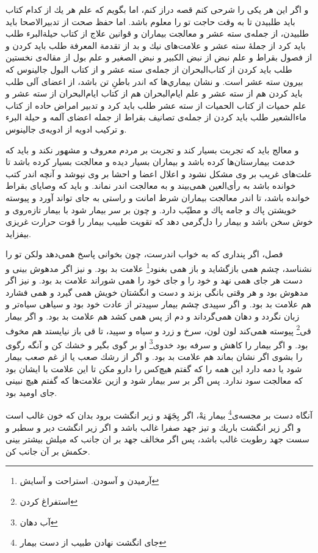 و اگر اين هر يكى را شرحى كنم قصه دراز كنم، اما بگويم كه علم هر يك از كدام كتاب بايد طلبيدن تا به وقت حاجت تو را معلوم باشد. اما حفظ صحت از تدبير‌الاصحا بايد طلبيدن، از جمله‌ی سته عشر و معالجت بيماران و قوانين علاج از كتاب حيلة‌البرء طلب بايد كرد از جملۀ سته عشر و علامت‌هاى نيك و بد از تقدمة المعرفة طلب بايد كردن و از فصول بقراط و علم نبض از نبض الكبير و نبض الصغير و علم بول از مقاله‌ی نخستين طلب بايد كردن از كتاب‌البحران از جمله‌ی سته عشر و از كتاب البول جالينوس كه بيرون سته عشر است. و نشان بيماري‌ها كه اندر باطنِ تن باشد، از اعضاى آلى طلب بايد كردن هم از سته عشر و علم ايام‌البحران هم از كتاب ايام‌البحران از سته عشر و علم حميات از كتاب الحميات از سته عشر طلب بايد كرد و تدبير امراض حاده از كتاب ماء‌الشعير طلب بايد كردن از جمله‌ی تصانيف بقراط از جمله اعضاى آلمه و حيلة البرء و تركيب ادويه از ادويه‌ی جالينوس.

و معالج بايد كه تجربت بسيار كند و تجربت بر مردم معروف و مشهور نكند و بايد كه خدمت بيمارستان‌ها كرده باشد و بيماران بسيار ديده و معالجت بسيار كرده باشد تا علت‌هاى غريب بر وى مشكل نشود و اعلال اعضا و احشا بر وى نپوشد و آنچه اندر كتب خوانده باشد به رأى‌العين همى‌بيند و به معالجت اندر نماند. و بايد كه وصاياى بقراط خوانده باشد، تا اندر معالجت بيماران شرط امانت و راستى به جاى تواند آورد و پيوسته خويشتن پاك و جامه پاك و مطيّب دارد. و چون بر سر بيمار شود با بيمار تازه‌روى و خوش سخن باشد و بيمار را دل‌گرمى دهد كه تقويت طبيب بيمار را قوت حرارت غريزى بيفزايد.
 
فصل، اگر پندارى كه به خواب اندرست، چون بخوانى پاسخ همى‌دهد ولكن تو را نشناسد، چشم همى بازگشايد و باز همى بغنود\footnote{آرمیدن و آسودن. استراحت و آسایش} علامت بد بود. و نيز اگر مدهوش بينى و دست هر جاى همى نهد و خود را و جاى خود را همى شوراند علامت بد بود. و نيز اگر مدهوش بود و هر وقتى بانگى بزند و دست و انگشتان خويش همى گيرد و همى فشارد هم علامت بد بود. و اگر سپيدى چشم بيمار سپيدتر از عادت خود بود و سياهى سياه‌تر و زبان نگردد و دهان همى‌گرداند و دم از پس همى كشد هم علامت بد بود. و اگر بيمار قى\footnote{استفراغ کردن} پيوسته همى‌كند لون لون، سرخ و زرد و سياه و سپيد، تا قى باز نیايستد هم مخوف بود. و اگر بيمار را كاهش و سرفه بود خدوى\footnote{آب دهان} او بر گوى بگير و خشك كن و آنگه رگوى را بشوى اگر نشان بماند هم علامت بد بود. و اگر از رشك صعب يا از غم صعب بيمار شود يا دمه دارد اين همه را كه گفتم هيچ‌كس را دارو مكن تا اين علامت با ايشان بود كه معالجت سود ندارد. پس اگر بر سر بيمار شود و ازين علامت‌ها كه گفتم هيچ نبينى جاى اوميد بود.

آنگاه دست بر مجسه‌ی\footnote{جای انگشت نهادن طبیب از دست بیمار} بيمار نِهْ، اگر بِجَهَد و زير انگشت برود بدان كه خون غالب است و اگر زير انگشت باريك و تيز جهد صفرا غالب باشد و اگر زير انگشت دير و سطبر و سست جهد رطوبت غالب باشد، پس اگر مخالف جهد بر ان جانب كه ميلش بيشتر بينى حكمش بر آن جانب كن.

